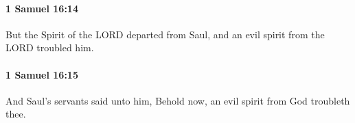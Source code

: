 		\paragraph{1 Samuel 16:14} %
			\label{1SAMUEL-16-14}

			But the Spirit of the LORD departed from Saul, and an evil spirit from the LORD troubled him.


		\paragraph{1 Samuel 16:15} %
			\label{1SAMUEL-16-15}

			And Saul’s servants said unto him, Behold now, an evil spirit from God troubleth thee.


